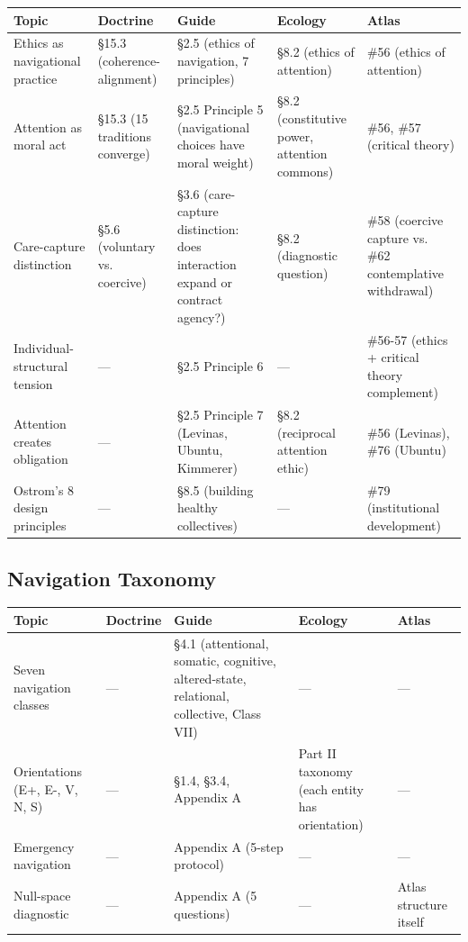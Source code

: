 \begin{longtable}{p{} p{} p{} p{} p{}}
\toprule
\textbf{Topic} & \textbf{Doctrine} & \textbf{Guide} & \textbf{Ecology} & \textbf{Atlas} \\
\midrule
\endhead
Ethics as navigational practice & §15.3 (coherence-alignment) & §2.5 (ethics of navigation, 7 principles) & §8.2 (ethics of attention) & \#56 (ethics of attention) \\
Attention as moral act & §15.3 (15 traditions converge) & §2.5 Principle 5 (navigational choices have moral weight) & §8.2 (constitutive power, attention commons) & \#56, \#57 (critical theory) \\
Care-capture distinction & §5.6 (voluntary vs. coercive) & §3.6 (care-capture distinction: does interaction expand or contract agency?) & §8.2 (diagnostic question) & \#58 (coercive capture vs. \#62 contemplative withdrawal) \\
Individual-structural tension & — & §2.5 Principle 6 & — & \#56-57 (ethics + critical theory complement) \\
Attention creates obligation & — & §2.5 Principle 7 (Levinas, Ubuntu, Kimmerer) & §8.2 (reciprocal attention ethic) & \#56 (Levinas), \#76 (Ubuntu) \\
Ostrom's 8 design principles & — & §8.5 (building healthy collectives) & — & \#79 (institutional development) \\
\bottomrule
\end{longtable}



\subsection*{Navigation Taxonomy}



\begin{longtable}{p{} p{} p{} p{} p{}}
\toprule
\textbf{Topic} & \textbf{Doctrine} & \textbf{Guide} & \textbf{Ecology} & \textbf{Atlas} \\
\midrule
\endhead
Seven navigation classes & — & §4.1 (attentional, somatic, cognitive, altered-state, relational, collective, Class VII) & — & — \\
Orientations (E+, E-, V, N, S) & — & §1.4, §3.4, Appendix A & Part II taxonomy (each entity has orientation) & — \\
Emergency navigation & — & Appendix A (5-step protocol) & — & — \\
Null-space diagnostic & — & Appendix A (5 questions) & — & Atlas structure itself \\
\bottomrule
\end{longtable}




